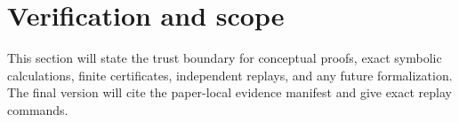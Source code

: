 \section{Verification and scope}

This section will state the trust boundary for conceptual proofs, exact
symbolic calculations, finite certificates, independent replays, and any
future formalization.  The final version will cite the paper-local
evidence manifest and give exact replay commands.
